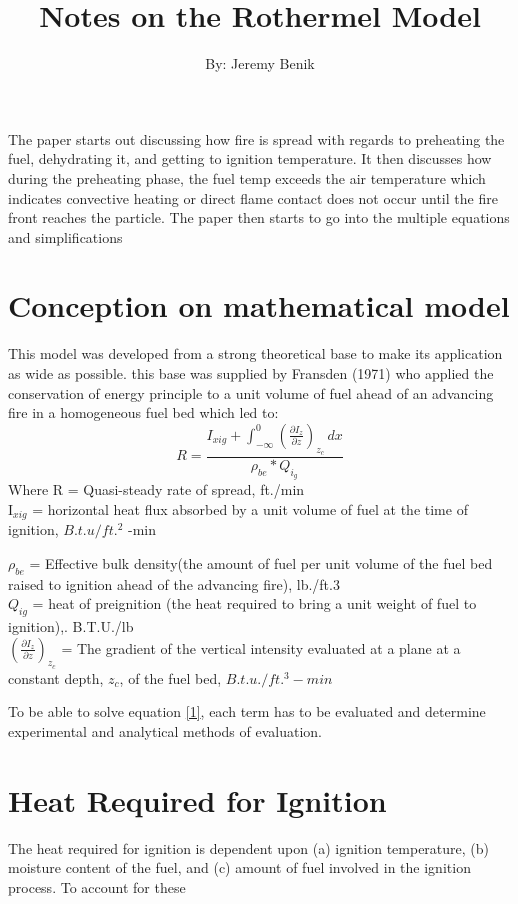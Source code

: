 \documentclass{article}
\begin{document}
\title{Notes on the Rothermel Model}
\author{By: Jeremy Benik}
\maketitle
The paper starts out discussing how fire is spread with regards to preheating the fuel, dehydrating it, and getting to ignition temperature. It then discusses how during the preheating phase, the fuel temp exceeds the air temperature which indicates convective heating or direct flame contact does not occur until the fire front reaches the particle. The paper then starts to go into the multiple equations and simplifications
\section{Conception on mathematical model}
\indent This model was developed from a strong theoretical base to make its application as wide as possible. this base was supplied by Fransden (1971) who applied the conservation of energy principle to a unit volume of fuel ahead of an advancing fire in a homogeneous fuel bed which led to: 
\begin{equation} 
\label{1}
R = \frac {I_{xig} + \int_{-\infty}^{0} (\frac {\partial I_{z}} {\partial z})_{z_c}\,dx }{\rho_{be} * Q_{i_g}}
\end{equation}
\newline
Where R = Quasi-steady rate of spread, ft./min \\

\noindent I$_{xig}$ = horizontal heat flux absorbed by a unit volume of fuel at the time of ignition, $B.t.u/ft.^2$ -min \newline

\noindent $\rho_{be}$ = Effective bulk density(the amount of fuel per unit volume of the fuel bed raised to ignition ahead of the advancing fire), lb./ft.3 \\

\noindent $Q_{ig}$ = heat of preignition (the heat required to bring a unit weight of fuel to ignition),. B.T.U./lb \\

\noindent $(\frac {\partial {I_z}} {\partial z})_{z_c}$ = The gradient of the vertical intensity evaluated at a plane at a constant depth, $z_c$, of the fuel bed, $B.t.u./ft.^3 -min$
	
To be able to solve equation \ref{1}, each term has to be evaluated and determine experimental and analytical methods of evaluation. 

\section{Heat Required for Ignition}
\indent The heat required for ignition is dependent upon (a) ignition temperature, (b) moisture content of the fuel, and (c) amount of fuel involved in the ignition process. To account for these 



	
\end{document}
